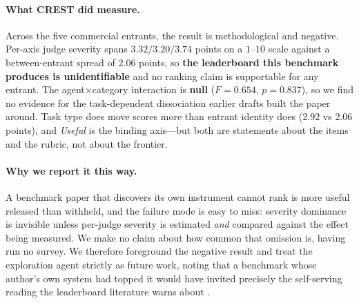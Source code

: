 \paragraph{What CREST did measure.} Across the five commercial entrants, the result is
methodological and negative. Per-axis judge severity spans $3.32/3.20/3.74$ points on a $1$--$10$
scale against a between-entrant spread of $2.06$ points, so \textbf{the leaderboard this benchmark
produces is unidentifiable} and no ranking claim is supportable for any entrant. The
agent$\times$category interaction is \textbf{null} ($F=0.654$, $p=0.837$), so we find no evidence
for the task-dependent dissociation earlier drafts built the paper around. Task type does move
scores more than entrant identity does ($2.92$ vs $2.06$ points), and \emph{Useful} is the binding
axis---but both are statements about the items and the rubric, not about the frontier.

\paragraph{Why we report it this way.} A benchmark paper that discovers its own instrument cannot
rank is more useful released than withheld, and the failure mode is easy to miss: severity dominance
is invisible unless per-judge severity is estimated \emph{and} compared against the effect being
measured. We make no claim about how common that omission is, having run no survey. We
therefore foreground the negative result and treat the exploration agent strictly as future work,
noting that a benchmark whose author's own system had topped it would have invited precisely the
self-serving reading the leaderboard literature warns about \citep{singh2025leaderboard}.


